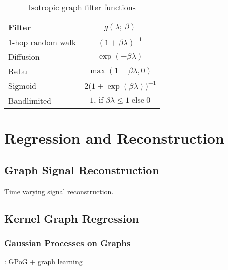 \begin{table}[b]
    \renewcommand{\arraystretch}{1.7}
    \small
    \begin{center}
    \begin{tabular}{|l|c|}
    \hline
    \textbf{Filter}   & $g(\lambda; \,\beta)$    \\ 
    \hline
    1-hop random walk & $(1 + \beta \lambda)^{-1}$ \\
    \hline
    Diffusion         & $\exp(-\beta \lambda)$       \\
    \hline
    ReLu              & $\max (1 - \beta \lambda, 0)$  \\
    \hline
    Sigmoid           & $2 \big( 1 + \exp(\beta \lambda)\big)^{-1}$ \\
    \hline
    Bandlimited       & $1, \,\text{if} \; \beta \lambda \leq 1 \; \text{else} \; 0$   \\
    \hline
    \end{tabular}
    \end{center}
    \caption{Isotropic graph filter functions}
    \label{tab:iso_filters}
    \end{table}



\section{Regression and Reconstruction}


\subsection{Graph Signal Reconstruction}

\cite{Qiu2017} Time varying signal reconstruction. 

\subsection{Kernel Graph Regression}

\cite{Takeda2007}

\cite{Elias2022}

\cite{Venkitaraman2019}


\subsubsection{Gaussian Processes on Graphs}

\cite{Venkitaraman2020}

\cite{Miao2022}: GPoG + graph learning

